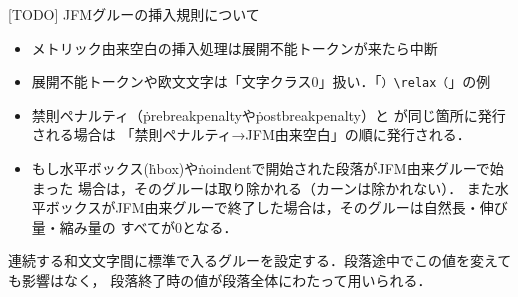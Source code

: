 \documentclass[a4paper,11pt,nomag,dvipdfmx]{jsarticle}
\begin{document}
[TODO] JFMグルーの挿入規則について
\begin{itemize}
 \item メトリック由来空白の挿入処理は展開不能トークンが来たら中断
 \item 展開不能トークンや欧文文字は「文字クラス0」扱い．「\verb+）\relax（+」の例
 \item 禁則ペナルティ（\.{prebreakpenalty}や\.{postbreakpenalty}）と
  が同じ箇所に発行される場合は
  「禁則ペナルティ→JFM由来空白」の順に発行される．
\iffalse %
 \item より一般に，禁則ペナルティ，JFM由来空白，ベースライン補正，
  欧文TFM由来カーンが同じ箇所に発行される場合は
  次の順になる（\ref{sec:kinsoku}節の注意の一般化）．%
  \begin{itemize}
   \item 和文→欧文：禁則ペナルティ→JFM由来空白→ベースライン補正→%
   欧文TFM由来カーン
   \item 欧文→和文：ベースライン補正→禁則ペナルティ→JFM由来空白
   \footnote{[TODO] \TeX~Live~2019の\pTeX~3.8.2では，欧文TFM由来カーンは欧文→和文の
   切替時には挿入されない．}%
  \end{itemize}
\fi %
 \item もし水平ボックス(\.{hbox})や\.{noindent}で開始された段落がJFM由来グルーで始まった
   場合は，そのグルーは取り除かれる（カーンは除かれない）．
   また水平ボックスがJFM由来グルーで終了した場合は，そのグルーは自然長・伸び量・縮み量の
   すべてが0となる．
\end{itemize}

\begin{cslist}
\csitem[\.{kanjiskip}=<skip>]
  連続する和文文字間に標準で入るグルーを設定する．段落途中でこの値を変えても影響はなく，
  段落終了時の値が段落全体にわたって用いられる．
\end{cslist}
\end{document}
